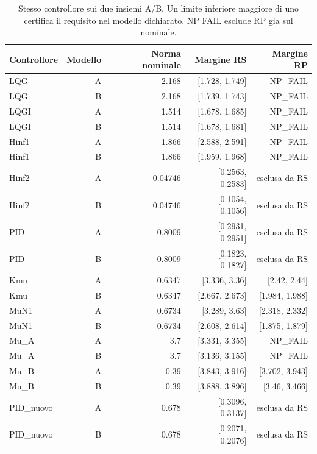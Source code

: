 \par
\begin{table}[htbp]\centering\small
\setlength{\tabcolsep}{4pt}
\begin{tabular}{lrrrr}\toprule
Controllore & Modello & Norma nominale & Margine RS & Margine RP\\\midrule
LQG & A & 2.168 & [1.728, 1.749] & NP\_FAIL\\
LQG & B & 2.168 & [1.739, 1.743] & NP\_FAIL\\
LQGI & A & 1.514 & [1.678, 1.685] & NP\_FAIL\\
LQGI & B & 1.514 & [1.678, 1.681] & NP\_FAIL\\
Hinf1 & A & 1.866 & [2.588, 2.591] & NP\_FAIL\\
Hinf1 & B & 1.866 & [1.959, 1.968] & NP\_FAIL\\
Hinf2 & A & 0.04746 & [0.2563, 0.2583] & esclusa da RS\\
Hinf2 & B & 0.04746 & [0.1054, 0.1056] & esclusa da RS\\
PID & A & 0.8009 & [0.2931, 0.2951] & esclusa da RS\\
PID & B & 0.8009 & [0.1823, 0.1827] & esclusa da RS\\
Kmu & A & 0.6347 & [3.336, 3.36] & [2.42, 2.44]\\
Kmu & B & 0.6347 & [2.667, 2.673] & [1.984, 1.988]\\
MuN1 & A & 0.6734 & [3.289, 3.63] & [2.318, 2.332]\\
MuN1 & B & 0.6734 & [2.608, 2.614] & [1.875, 1.879]\\
Mu\_A & A & 3.7 & [3.331, 3.355] & NP\_FAIL\\
Mu\_A & B & 3.7 & [3.136, 3.155] & NP\_FAIL\\
Mu\_B & A & 0.39 & [3.843, 3.916] & [3.702, 3.943]\\
Mu\_B & B & 0.39 & [3.888, 3.896] & [3.46, 3.466]\\
PID\_nuovo & A & 0.678 & [0.3096, 0.3137] & esclusa da RS\\
PID\_nuovo & B & 0.678 & [0.2071, 0.2076] & esclusa da RS\\
\bottomrule\end{tabular}
\caption{Stesso controllore sui due insiemi A/B. Un limite inferiore maggiore di uno certifica il requisito nel modello dichiarato. NP FAIL esclude RP gia sul nominale.}
\end{table}
\par
